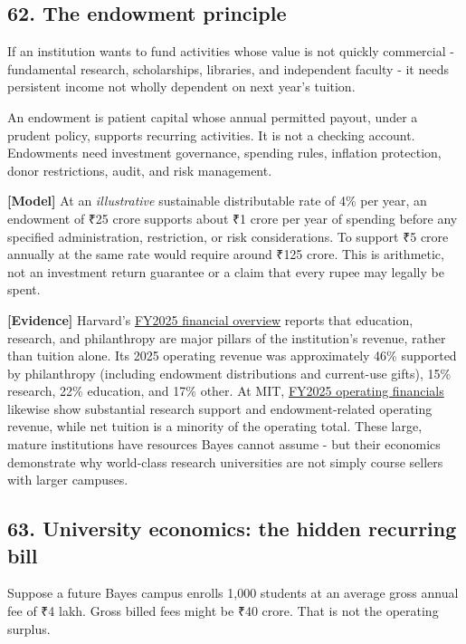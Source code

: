 \subsection{62. The endowment principle}

If an institution wants to fund activities whose value is not quickly commercial - fundamental research, scholarships, libraries, and independent faculty - it needs persistent income not wholly dependent on next year's tuition.

An endowment is patient capital whose annual permitted payout, under a prudent policy, supports recurring activities. It is not a checking account. Endowments need investment governance, spending rules, inflation protection, donor restrictions, audit, and risk management.

\textbf{\textbf{[Model]}} At an \textit{illustrative} sustainable distributable rate of 4\% per year, an endowment of \textnormal{₹}25 crore supports about \textnormal{₹}1 crore per year of spending before any specified administration, restriction, or risk considerations. To support \textnormal{₹}5 crore annually at the same rate would require around \textnormal{₹}125 crore. This is arithmetic, not an investment return guarantee or a claim that every rupee may legally be spent.

\textbf{\textbf{[Evidence]}} Harvard's \href{https://finance.harvard.edu/\allowbreak fy25-financial-overview}{FY2025 financial overview} reports that education, research, and philanthropy are major pillars of the institution's revenue, rather than tuition alone. Its 2025 operating revenue was approximately 46\% supported by philanthropy (including endowment distributions and current-use gifts), 15\% research, 22\% education, and 17\% other. At MIT, \href{https://facts.mit.edu/\allowbreak operating-financials/}{FY2025 operating financials} likewise show substantial research support and endowment-related operating revenue, while net tuition is a minority of the operating total. These large, mature institutions have resources Bayes cannot assume - but their economics demonstrate why world-class research universities are not simply course sellers with larger campuses.

\subsection{63. University economics: the hidden recurring bill}

Suppose a future Bayes campus enrolls 1,000 students at an average gross annual fee of \textnormal{₹}4 lakh. Gross billed fees might be \textnormal{₹}40 crore. That is not the operating surplus.

